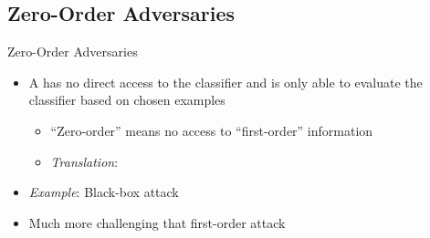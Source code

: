 \subsection{Zero-Order Adversaries}
\begin{frame}{Zero-Order Adversaries}
  \begin{itemize}[<+->]
    \setlength{\itemsep}{20pt}
    \item A  has no direct access to the classifier and is only able to evaluate the classifier based on chosen examples
      \begin{itemize}
        \setlength{\itemsep}{8pt}
        \item ``Zero-order'' means no access to ``first-order'' information
        \item \textit{Translation}: 
      \end{itemize}

    \item \textit{Example}: Black-box attack

    \item Much more challenging that first-order attack
  \end{itemize}
\end{frame}
